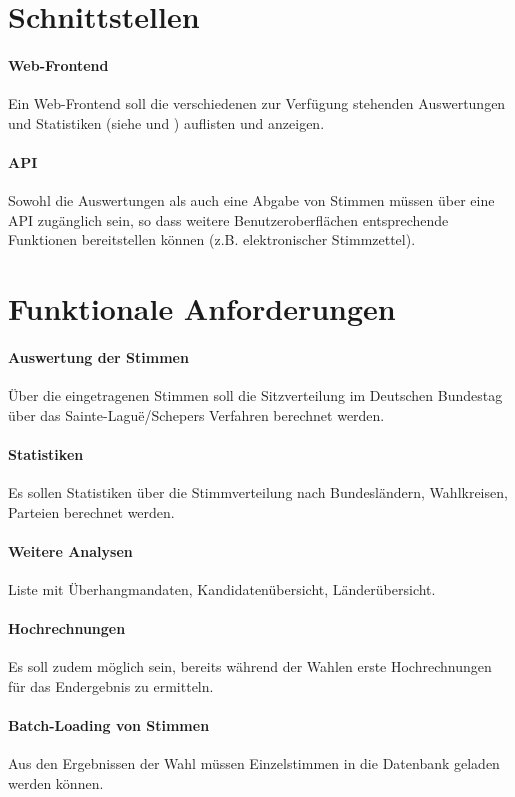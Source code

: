 \documentclass[11pt,a4paper]{scrartcl}
\begin{document}
\section{Schnittstellen}
\paragraph{Web-Frontend}
Ein Web-Frontend soll die verschiedenen zur Verfügung stehenden Auswertungen und Statistiken (siehe  und ) auflisten und anzeigen.
\paragraph{API}
Sowohl die Auswertungen als auch eine Abgabe von Stimmen müssen über eine API zugänglich sein, so dass weitere Benutzeroberflächen entsprechende Funktionen bereitstellen können (z.B. elektronischer Stimmzettel).
\section{Funktionale Anforderungen}
\paragraph{Auswertung der Stimmen}
\label{par:auswertung}
Über die eingetragenen Stimmen soll die Sitzverteilung im Deutschen Bundestag über das Sainte-Laguë/Schepers Verfahren berechnet werden.
\paragraph{Statistiken}
\label{par:statistiken}
Es sollen Statistiken über die Stimmverteilung nach Bundesländern, Wahlkreisen, Parteien berechnet werden.
\paragraph{Weitere Analysen}
Liste mit Überhangmandaten, Kandidatenübersicht, Länderübersicht.
\paragraph{Hochrechnungen}
Es soll zudem möglich sein, bereits während der Wahlen erste Hochrechnungen für das Endergebnis zu ermitteln.
\paragraph{Batch-Loading von Stimmen}
Aus den Ergebnissen der Wahl müssen Einzelstimmen in die Datenbank geladen
werden können.
\end{document}
